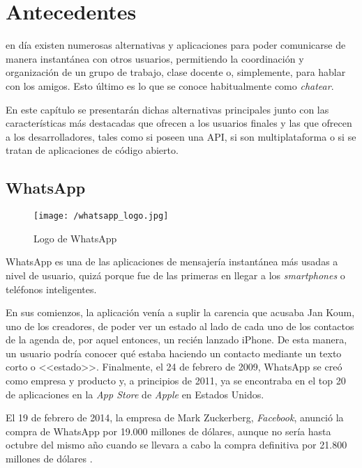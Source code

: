 \chapter{Antecedentes}
\label{chap:antecedentes}

 en día existen numerosas alternativas y aplicaciones para poder comunicarse de manera instantánea con otros usuarios, permitiendo la coordinación y organización de un grupo de trabajo, clase docente o, simplemente, para hablar con los amigos. Esto último es lo que se conoce habitualmente como \textit{chatear}.

En este capítulo se presentarán dichas alternativas principales junto con las características más destacadas que ofrecen a los usuarios finales y las que ofrecen a los desarrolladores, tales como si poseen una \acf{API}, si son multiplataforma o si se tratan de aplicaciones de código abierto.

\section{WhatsApp}
\label{sec:whatsapp}

\begin{figure}
	\begin{center}
		\texttt{[image: /whatsapp\_logo.jpg]}
		\caption{Logo de WhatsApp}
		\label{fig:whatsapp}
	\end{center}
\end{figure}

WhatsApp es una de las aplicaciones de mensajería instantánea más usadas a nivel de usuario, quizá porque fue de las primeras en llegar a los \textit{smartphones} o teléfonos inteligentes.

En sus comienzos, la aplicación venía a suplir la carencia que acusaba Jan Koum, uno de los creadores, de poder ver un estado al lado de cada uno de los contactos de la agenda de, por aquel entonces, un recién lanzado iPhone. De esta manera, un usuario podría conocer qué estaba haciendo un contacto mediante un texto corto o <<estado>>. Finalmente, el 24 de febrero de 2009, WhatsApp se creó como empresa y producto y, a principios de 2011, ya se encontraba en el top 20 de aplicaciones en la \textit{App Store} de \textit{Apple} en Estados Unidos.

\newpage

El 19 de febrero de 2014, la empresa de Mark Zuckerberg, \textit{Facebook}, anunció la compra de WhatsApp por 19.000 millones de dólares, aunque no sería hasta octubre del mismo año cuando se llevara a cabo la compra definitiva por 21.800 millones de dólares \cite{Novoa2014}.

